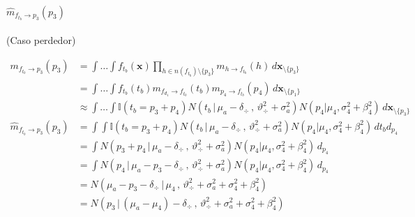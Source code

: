 \documentclass[11pt,twoside, spanish]{report} %
\begin{document}
\paragraph{$\widehat{m}_{f_{t_b} \rightarrow p_3}(p_3)$} (Caso perdedor)

\begin{equation}
	\begin{split}
		m_{f_{t_b} \rightarrow p_3}(p_3) &= \int \dots \int f_{t_b}(\textbf{x}) \prod_{h \in n(f_{t_b}) \setminus \{p_3\} } m_{h \rightarrow f_{t_b}}(h) \, d\textbf{x}_{\setminus \{p_3\} }  \\
		&= \int \dots \int f_{t_b}(t_b)  m_{f_{d_1} \rightarrow f_{t_b}}(t_b) m_{p_4 \rightarrow f_{t_b}}(p_4)\, d\textbf{x}_{\setminus \{p_1\} }  \\
		&\approx  \int \dots \int \mathbb{I}(t_b = p_3 + p_4) N(t_b \, | \, \mu_a - \delta_{\div} \, , \, \vartheta_{\div}^2 + \sigma_a^2) N(p_4 | \mu_4 , \sigma_4^2 + \beta_4^2)  \, d\textbf{x}_{\setminus \{p_3\} } \\[0.1cm]
		\widehat{m}_{f_{t_b} \rightarrow p_3}(p_3)  & =\int \int \mathbb{I}(t_b = p_3 + p_4) N(t_b \, | \, \mu_a - \delta_{\div} \, , \, \vartheta_{\div}^2 + \sigma_a^2) N(p_4 | \mu_4 , \sigma_4^2 + \beta_4^2)  \, d{t_b} d_{p_4} \\
		& =\int N(p_3 + p_4 \, | \, \mu_a - \delta_{\div} \, , \, \vartheta_{\div}^2 + \sigma_a^2) N(p_4 | \mu_4 , \sigma_4^2+ \beta_4^2 )   \, d_{p_4} \\
		& =\int N(p_4 \, | \, \mu_a - p_3 - \delta_{\div} \, , \, \vartheta_{\div}^2 + \sigma_a^2) N(p_4 | \mu_4 , \sigma_4^2 + \beta_4^2)   \, d_{p_4} \\
		& = N(\mu_a - p_3 - \delta_{\div} \,|\, \mu_4 \,,\,\vartheta_{\div}^2 + \sigma_a^2 + \sigma_4^2 + \beta_4^2)   \\
		&=  N( p_3 \,|\,  (\mu_a - \mu_4) - \delta_{\div}  \,,\,\vartheta_{\div}^2 + \sigma_a^2 + \sigma_4^2 + \beta_4^2)  \\
	\end{split}
\end{equation}
\end{document}
